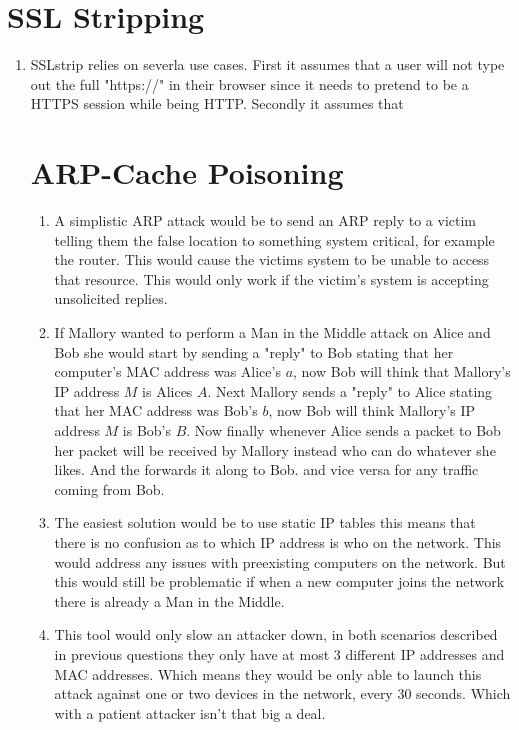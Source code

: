 \documentclass{article}
\begin{document}
\section{SSL Stripping}
\begin{enumerate}[A]
    \item SSLstrip relies on severla use cases. First it assumes that a user will not type out the full "https://" in their browser since it needs to pretend to be a HTTPS session while being HTTP. Secondly it assumes that
\section{ARP-Cache Poisoning}
\begin{enumerate}[A]
	\item A simplistic ARP attack would be to send an ARP reply to a victim
		telling them the false location to something system critical, for
		example the router. This would cause the victims system to be unable to
		access that resource. This would only work if the victim's system is
		accepting unsolicited replies.
	\item If Mallory wanted to perform a Man in the Middle attack on Alice and
		Bob she would start by sending a "reply" to Bob stating that her
		computer's MAC address was Alice's $a$, now Bob will think that
		Mallory's IP address $M$ is Alices $A$. Next Mallory sends a "reply" to
		Alice stating that her MAC address was Bob's $b$, now Bob will think
		Mallory's IP address $M$ is Bob's $B$. Now finally whenever
		Alice sends a packet to Bob her packet will be received by Mallory
		instead who can do whatever she likes. And the forwards it along to Bob.
		and vice versa for any traffic coming from Bob.
	\item The easiest solution would be to use static IP tables this means that
		there is no confusion as to which IP address is who on the network. This
		would address any issues with preexisting computers on the network. But
		this would still be problematic if when a new computer joins the network
		there is already a Man in the Middle.
	\item This tool would only slow an attacker down, in both scenarios
		described in previous questions they only have at most 3 different IP
		addresses and MAC addresses. Which means they would be only able to
		launch this attack against one or two devices in the network, every 30
		seconds. Which with a patient attacker isn't that big a deal.
\end{enumerate}

\end{enumerate}
\end{document}
